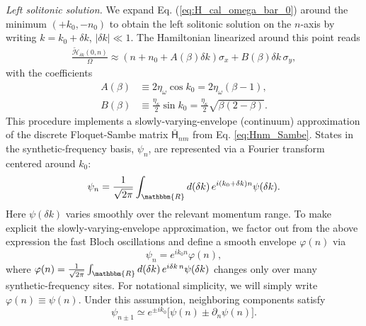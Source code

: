 \documentclass[a4paper,twocolumn,floatfix,10pt,superscriptaddress]%
{quantumarticle}
\newcommand{\mcl}[1]{\mathcal{#1}}
\begin{document}



\emph{Left solitonic solution.}
We expand Eq. (\ref{eq:H_cal_omega_bar_0}) around the minimum $(+k_0,-n_0)$ to obtain the left solitonic solution on the $n$-axis by writing $k=k_0+\delta k$, $|\delta k|\ll1$. The Hamiltonian linearized around this point reads
\begin{align}
\frac{\tilde{\mcl{H}}_{\delta k}(0,n)}{\Omega}\approx(n+n_0 + A(\beta)\delta k)\sigma_x
+B(\beta)\delta k\,\sigma_y,
\end{align}
with the coefficients %
\begin{align}
A(\beta)&\equiv2\eta_\omega\cos k_0=2\eta_\omega(\beta-1),\\
B(\beta)&\equiv\frac{\eta_\kappa}{2}\sin k_0=\frac{\eta_\kappa}{2}\sqrt{\beta(2-\beta)}.
\end{align}
This procedure implements a slowly-varying-envelope (continuum) approximation of the discrete Floquet-Sambe matrix $\bar{\mathsf{H}}_{n m}$ from Eq. \eqref{eq:Hnm_Sambe}. States in the synthetic-frequency basis, $\psi_n$, are represented via a Fourier transform centered around $k_0$:
\begin{align}
    \psi_n=\frac{1}{\sqrt{2\pi}}\int_{\mathbbm{R}} d(\delta k)\,e^{i(k_0+\delta k)n}\psi(\delta k).
\end{align}
Here $\psi(\delta k)$ varies smoothly over the relevant momentum range. To make explicit the slowly-varying-envelope approximation, we factor out from the above expression the fast Bloch oscillations and define a smooth envelope $\varphi(n)$ via
\begin{equation}
\psi_n = e^{ik_0 n} \varphi(n),
\end{equation}
where $\varphi(n)=\frac{1}{\sqrt{2\pi}}\int_{\mathbbm{R}} d(\delta k)\,e^{i\delta k\,n}\psi(\delta k)$ changes only over many synthetic-frequency sites. For notational simplicity, we will simply write $\varphi(n)\equiv \psi(n)$. Under this assumption, neighboring components satisfy
\begin{equation}
\psi_{n\pm1} \simeq e^{\pm ik_0}\big[\psi(n) \pm \partial_n \psi(n)\big].
\end{equation}
\end{document}
